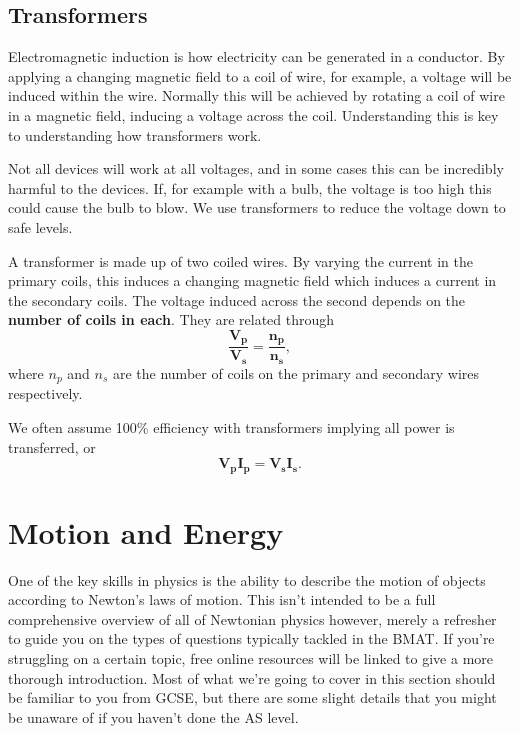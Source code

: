 \documentclass[11pt, titlepage]{article}
\begin{document}
\subsection{Transformers}
Electromagnetic induction is how electricity can be generated in a conductor.  By applying a changing magnetic field to a coil of wire, for example, a voltage will be induced within the wire.  Normally this will be achieved by rotating a coil of wire in a magnetic field, inducing a voltage across the coil.  Understanding this is key to understanding how transformers work.

Not all devices will work at all voltages, and in some cases this can be incredibly harmful to the devices.  If, for example with a bulb, the voltage is too high this could cause the bulb to blow.  We use transformers to reduce the voltage down to safe levels.

A transformer is made up of two coiled wires.  By varying the current in the primary coils, this induces a changing magnetic field which induces a current in the secondary coils.  The voltage induced across the second depends on the \textbf{number of coils in each}.  They are related through
\begin{equation*}
\mathbf{\frac{V_p}{V_s} = \frac{n_p}{n_s}},
\end{equation*}
where $n_p$ and $n_s$ are the number of coils on the primary and secondary wires respectively.  

We often assume 100\% efficiency with transformers implying all power is transferred, or
\begin{equation*}
\mathbf{V_pI_p = V_sI_s.}
\end{equation*}



\section{Motion and Energy}
One of the key skills in physics is the ability to describe the motion of objects according to Newton's laws of motion.  This isn't intended to be a full comprehensive overview of all of Newtonian physics however, merely a refresher to guide you on the types of questions typically tackled in the BMAT.  If you're struggling on a certain topic, free online resources will be linked to give a more thorough introduction.  Most of what we're going to cover in this section should be familiar to you from GCSE, but there are some slight details that you might be unaware of if you haven't done the AS level.
\end{document}
